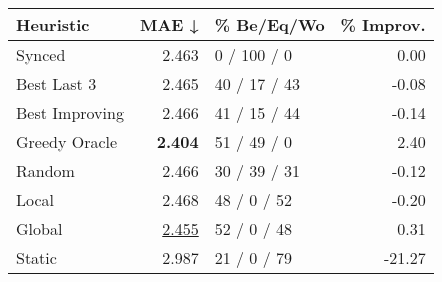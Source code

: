 \begin{tabular}{lrlr}
\toprule
\textbf{Heuristic} & \textbf{MAE ↓} & \textbf{\% Be/Eq/Wo} & \textbf{\% Improv.} \\
\midrule
            Synced &          2.463 &          0 / 100 / 0 &                0.00 \\
\midrule
       Best Last 3 &          2.465 &         40 / 17 / 43 &               -0.08 \\
    Best Improving &          2.466 &         41 / 15 / 44 &               -0.14 \\
\addlinespace
     Greedy Oracle &          \textbf{2.404} &          51 / 49 / 0 &                2.40 \\
            Random &          2.466 &         30 / 39 / 31 &               -0.12 \\
\midrule
             Local &          2.468 &          48 / 0 / 52 &               -0.20 \\
            Global &          \underline{2.455} &          52 / 0 / 48 &                0.31 \\
\midrule
            Static &          2.987 &          21 / 0 / 79 &              -21.27 \\
\bottomrule
\end{tabular}

\label{tab:hr_non_lr01_le2_bs2_Summary}
